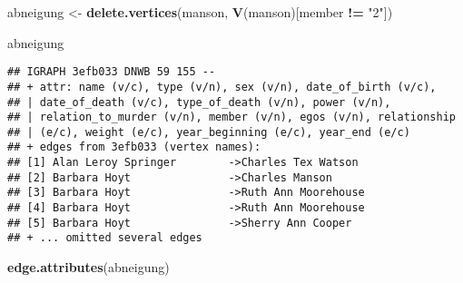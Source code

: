 \documentclass[
]{article}
\newenvironment{Shaded}{\begin{snugshade}}{\end{snugshade}}
\newcommand{\KeywordTok}[1]{\textcolor[rgb]{0.13,0.29,0.53}{\textbf{#1}}}
\newcommand{\NormalTok}[1]{#1}
\newcommand{\OperatorTok}[1]{\textcolor[rgb]{0.81,0.36,0.00}{\textbf{#1}}}
\newcommand{\StringTok}[1]{\textcolor[rgb]{0.31,0.60,0.02}{#1}}
\begin{document}
\begin{Shaded}
\begin{Highlighting}[]
\NormalTok{abneigung <-}\StringTok{ }\KeywordTok{delete.vertices}\NormalTok{(manson, }\KeywordTok{V}\NormalTok{(manson)[member }\OperatorTok{!=}\StringTok{ "2"}\NormalTok{])}

\NormalTok{abneigung}
\end{Highlighting}
\end{Shaded}

\begin{verbatim}
## IGRAPH 3efb033 DNWB 59 155 -- 
## + attr: name (v/c), type (v/n), sex (v/n), date_of_birth (v/c),
## | date_of_death (v/c), type_of_death (v/n), power (v/n),
## | relation_to_murder (v/n), member (v/n), egos (v/n), relationship
## | (e/c), weight (e/c), year_beginning (e/c), year_end (e/c)
## + edges from 3efb033 (vertex names):
## [1] Alan Leroy Springer        ->Charles Tex Watson 
## [2] Barbara Hoyt               ->Charles Manson     
## [3] Barbara Hoyt               ->Ruth Ann Moorehouse
## [4] Barbara Hoyt               ->Ruth Ann Moorehouse
## [5] Barbara Hoyt               ->Sherry Ann Cooper  
## + ... omitted several edges
\end{verbatim}

\begin{Shaded}
\begin{Highlighting}[]
\KeywordTok{edge.attributes}\NormalTok{(abneigung)}
\end{Highlighting}
\end{Shaded}
\end{document}
